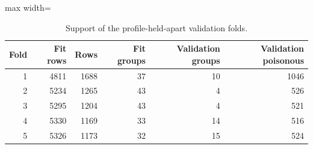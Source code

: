 \begin{table}[H]
\centering\small
\caption{Support of the profile-held-apart validation folds.}
\begin{adjustbox}{max width=\linewidth}\begin{tabular}{rrrrrr}
\toprule
Fold & Fit rows & Rows & Fit groups & Validation groups & Validation poisonous \\
\midrule
1 & 4811 & 1688 & 37 & 10 & 1046 \\
2 & 5234 & 1265 & 43 & 4 & 526 \\
3 & 5295 & 1204 & 43 & 4 & 521 \\
4 & 5330 & 1169 & 33 & 14 & 516 \\
5 & 5326 & 1173 & 32 & 15 & 524 \\
\bottomrule
\end{tabular}\end{adjustbox}
\end{table}
